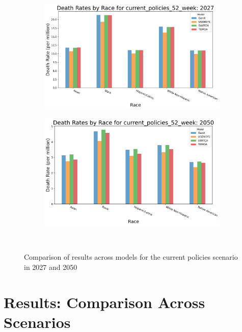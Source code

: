 \documentclass[a4paper]{article}
\theoremstyle{definition}
\theoremstyle{plain}
\begin{document}
\begin{figure}
    \centering
    \begin{subfigure}[b]{0.45\textwidth}
        \includegraphics[width=\textwidth]{Figures/Output/DeathRate_Across_Models_current_policies_52_week_2027.png}
        \label{2027CompareModels}
    \end{subfigure}
    \hfill
    \begin{subfigure}[b]{0.45\textwidth}
        \includegraphics[width=\textwidth]{Figures/Output/DeathRate_Across_Models_current_policies_52_week_2050.png}
        \label{2050CompareModels}
    \end{subfigure}\\

    \caption{Comparison of results across models for the current policies scenario in 2027 and 2050}
    \label{Compare Scenarios}
\end{figure}


\section{Results: Comparison Across Scenarios}
\end{document}
